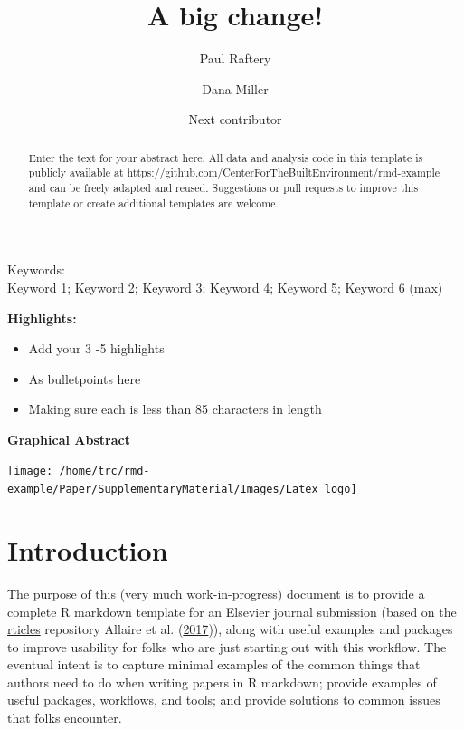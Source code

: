 \documentclass[]{elsarticle} %
\providecommand{\tightlist}{%
  \setlength{\itemsep}{0pt}\setlength{\parskip}{0pt}}
\begin{document}
\begin{frontmatter}

  \title{A big change!}
    \author[CBE]{Paul Raftery}
    \author[CBE]{Dana Miller}
  
    \author[Organization2]{Next contributor}
  
      \address[CBE]{Center for the Built Environment, UC Berkeley, 390 Wurster Hall, Berkeley, CA, 94720, USA}
    \address[Organisation2]{Another organization, and their address}
    
  \begin{abstract}
  Enter the text for your abstract here. All data and analysis code in this template is publicly available at \url{https://github.com/CenterForTheBuiltEnvironment/rmd-example} and can be freely adapted and reused. Suggestions or pull requests to improve this template or create additional templates are welcome.
  \end{abstract}
  
 \end{frontmatter}

Keywords:\\
Keyword 1; Keyword 2; Keyword 3; Keyword 4; Keyword 5; Keyword 6 (max)

\pagebreak

\textbf{Highlights:}

\begin{itemize}
\tightlist
\item
  Add your 3 -5 highlights
\item
  As bulletpoints here
\item
  Making sure each is less than 85 characters in length
\end{itemize}

\textbf{Graphical Abstract}

\texttt{[image: /home/trc/rmd-example/Paper/SupplementaryMaterial/Images/Latex\_logo]}

\pagebreak

\hypertarget{introduction}{%
\section{Introduction}\label{introduction}}

The purpose of this (very much work-in-progress) document is to provide a complete R markdown template for an Elsevier journal submission (based on the \href{https://github.com/rstudio/rticles}{rticles} repository Allaire et al. (\protect\hyperlink{ref-rticles}{2017})), along with useful examples and packages to improve usability for folks who are just starting out with this workflow. The eventual intent is to capture minimal examples of the common things that authors need to do when writing papers in R markdown; provide examples of useful packages, workflows, and tools; and provide solutions to common issues that folks encounter.
\end{document}
